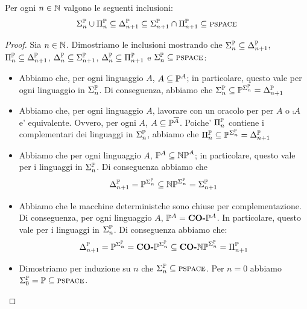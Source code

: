 \begin{thm}
    Per ogni $n \in \mathbb{N}$ valgono le seguenti inclusioni:
    \begin{equation*}
        \Sigma_{n}^{\mathbb{P}} \cup \Pi_{n}^{\mathbb{P}} \subseteq \Delta_{n+1}^{\mathbb{P}} \subseteq
        \Sigma_{n+1}^{\mathbb{P}} \cap \Pi_{n+1}^{\mathbb{P}} \subseteq \textsc{pspace}
    \end{equation*}
\end{thm}
\begin{proof}

    Sia $n \in \mathbb{N}$. Dimostriamo le inclusioni mostrando che $\Sigma_{n}^{\mathbb{P}} \subseteq
    \Delta_{n+1}^{\mathbb{P}}$, $\Pi_{n}^{\mathbb{P}} \subseteq \Delta_{n+1}^{\mathbb{P}}$,
    $\Delta_{n}^{\mathbb{P}} \subseteq \Sigma_{n+1}^{\mathbb{P}}$, $\Delta_{n}^{\mathbb{P}} \subseteq
    \Pi_{n+1}^{\mathbb{P}}$ e $\Sigma_{n}^{\mathbb{P}} \subseteq \textsc{pspace}$:
    \begin{itemize}
        \item Abbiamo che, per ogni linguaggio $A$, $A \subseteq \mathbb{P}^{A}$; in particolare,
            questo vale per ogni linguaggio in
            $\Sigma_{n}^{\mathbb{P}}$. Di conseguenza, abbiamo che $\Sigma_{n}^{\mathbb{P}} \subseteq \mathbb{P}^{\Sigma_{n}^{\mathbb{P}}} =
            \Delta_{n+1}^{\mathbb{P}}$
        \item Abbiamo che, per ogni linguaggio $A$, lavorare con un oracolo per per $A$ o
            $\comp{A}$ e' equivalente. Ovvero, per ogni $A$, $A \subseteq \mathbb{P}^{\overline{A}}$.
            Poiche' $\Pi_{n}^{\mathbb{P}}$ contiene i complementari dei linguaggi in
            $\Sigma_{n}^{\mathbb{P}}$, abbiamo che $\Pi_{n}^{\mathbb{P}} \subseteq
            \mathbb{P}^{\Sigma_{n}^{\mathbb{P}}} = \Delta_{n+1}^{\mathbb{P}}$
        \item Abbiamo che per ogni linguaggio $A$, $\mathbb{P}^{A} \subseteq \mathbb{NP}^{A}$; in
            particolare, questo vale per i linguaggi in $\Sigma_{n}^{\mathbb{P}}$. Di conseguenza
            abbiamo che
            \begin{equation*}
                \Delta_{n+1}^{\mathbb{P}} = \mathbb{P}^{\Sigma_{n}^{\mathbb{P}}} \subseteq \mathbb{NP}^{\Sigma_{n}^{\mathbb{P}}} =
                \Sigma_{n+1}^{\mathbb{P}}
            \end{equation*}
        \item Abbiamo che le macchine deterministche sono chiuse per complementazione. Di
            conseguenza, per ogni linguaggio $A$, $\mathbb{P}^{A} = \textbf{CO-}\mathbb{P}^{A}$. In particolare,
            questo vale per i linguaggi in $\Sigma_{n}^{\mathbb{P}}$. Di conseguenza abbiamo che:
            \begin{equation*}
                \Delta_{n+1}^{\mathbb{P}} = \mathbb{P}^{\Sigma_{n}^{\mathbb{P}}} = \textbf{CO-}\mathbb{P}^{\Sigma_{n}^{\mathbb{P}}} \subseteq
                \textbf{CO-}\mathbb{NP}^{\Sigma_{n}^{\mathbb{P}}} = \Pi_{n+1}^{\mathbb{P}}
            \end{equation*}
        \item Dimostriamo per induzione su $n$ che $\Sigma_{n}^{\mathbb{P}} \subseteq \textsc{pspace}$. Per $n = 0$
            abbiamo $\Sigma_{0}^{\mathbb{P}} = \mathbb{P} \subseteq \textsc{pspace}$.


\end{itemize}
\end{proof}
